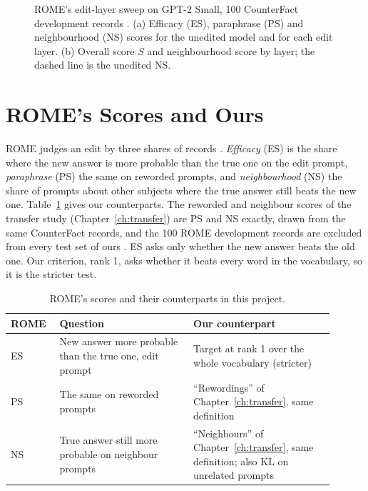 \begin{figure}[!htb]
\centering
{}
\caption{ROME's edit-layer sweep on GPT-2 Small, 100 CounterFact development records \cite{p15}. (a) Efficacy (ES), paraphrase (PS) and neighbourhood (NS) scores for the unedited model and for each edit layer. (b) Overall score $S$ and neighbourhood score by layer; the dashed line is the unedited NS.}\label{fig:rome-sweep}
\end{figure}

\section{ROME's Scores and Ours}\label{sec:rome-metrics}

ROME judges an edit by three shares of records \cite{r2}. \emph{Efficacy} (ES) is the share where the new answer is more probable than the true one on the edit prompt, \emph{paraphrase} (PS) the same on reworded prompts, and \emph{neighbourhood} (NS) the share of prompts about other subjects where the true answer still beats the new one. Table~\ref{tab:metricmap} gives our counterparts. The reworded and neighbour scores of the transfer study (Chapter~\ref{ch:transfer}) are PS and NS exactly, drawn from the same CounterFact records, and the 100 ROME development records are excluded from every test set of ours \cite{p16,p18}. ES asks only whether the new answer beats the old one. Our criterion, rank 1, asks whether it beats every word in the vocabulary, so it is the stricter test.

\begin{table}[t]
\centering\small
\caption{ROME's scores and their counterparts in this project.}\label{tab:metricmap}
\begin{tabular}{|p{0.12\linewidth}|p{0.38\linewidth}|p{0.40\linewidth}|}
\hline
\textbf{ROME} & \textbf{Question} & \textbf{Our counterpart} \\ \hline
ES & New answer more probable than the true one, edit prompt & Target at rank 1 over the whole vocabulary (stricter) \\ \hline
PS & The same on reworded prompts & ``Rewordings'' of Chapter~\ref{ch:transfer}, same definition \\ \hline
NS & True answer still more probable on neighbour prompts & ``Neighbours'' of Chapter~\ref{ch:transfer}, same definition; also KL on unrelated prompts \\ \hline
\end{tabular}
\end{table}


